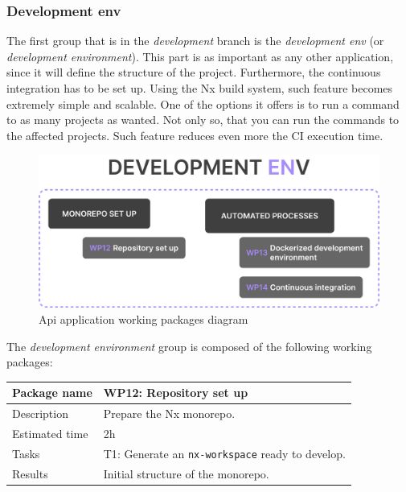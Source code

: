 \documentclass[a4paper, 12pt, oneside]{book}
\begin{document}
\subsubsection{Development env}
The first group that is in the \emph{development} branch is the \emph{development env} (or \emph{development environment}). This part is as important as any other application, since it will define the structure of the project. Furthermore, the continuous integration has to be set up. Using the Nx build system, such feature becomes extremely simple and scalable. One of the options it offers is to run a command to as many projects as wanted. Not only so, that you can run the commands to the affected projects. Such feature reduces even more the CI execution time.
\begin{figure}[H]
	\centering
	\includegraphics[width=\textwidth]{assets/working-packages/DevEnv.png}
	\caption{Api application working packages diagram}
\end{figure}
The \emph{development environment} group is composed of the following working packages:
\\[8pt]
\begin{tabularx}{\textwidth}{| l | X |}
	\hline
	\rowcolor{rowColor}
	{\semibf Package name}   & {\semibf WP12}: Repository set up                                 \\
	\hline
	{\semibf Description}    & Prepare the Nx monorepo.                                          \\
	\hline
	\rowcolor{rowColor}
	{\semibf Estimated time} & 2h                                                                \\
	\hline
	{\semibf Tasks}          & {\semibf T1}: Generate an \texttt{nx-workspace} ready to develop. \\
	\hline
	\rowcolor{rowColor}
	{\semibf Results}        & Initial structure of the monorepo.                                \\
	\hline
\end{tabularx}
\end{document}
